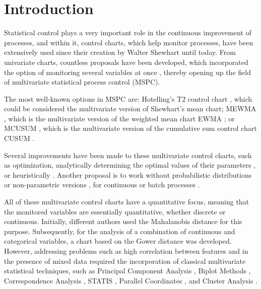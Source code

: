 \documentclass[mathematics,article,submit,moreauthors,pdftex]{mdpi}
\begin{document}

\hypertarget{introduction}{%
\section{Introduction}\label{introduction}}

Statistical control plays a very important role in the continuous
improvement of processes, and within it, control charts, which help
monitor processes, have been extensively used since their creation by
Walter Shewhart \citep{Gutierrez2013} until today. From univariate
charts, countless proposals have been developed, which incorporated the
option of monitoring several variables at once
\citep{ramos2017, li2012}, thereby opening up the field of multivariate
statistical process control (MSPC).

The most well-known options in MSPC are: Hotelling's T2 control chart
\citep{hotelling1947}, which could be considered the multivariate
version of Shewhart's mean chart; MEWMA \citep{lowry1992}, which is the
multivariate version of the weighted mean chart EWMA
\citep{roberts2000control}; or MCUSUM \citep{Crosier1988}, which is the
multivariate version of the cumulative sum control chart CUSUM
\citep{page1954continuous}.

Several improvements have been made to these multivariate control
charts, such as optimization, analytically determining the optimal
values of their parameters \citep{Aparisi1996, Aparisi2001, Faraz2006},
or heuristically \citep{ruiz2013}. Another proposal is to work without
probabilistic distributions or non-parametric versions
\citep{shabbak2012, liu2020, xue2020}, for continuous or batch processes
\citep{ramos2017}.

All of these multivariate control charts have a quantitative focus,
meaning that the monitored variables are essentially quantitative,
whether discrete or continuous. Initially, different authors used the
Mahalanobis distance \citep{mahalanobis1936generalised} for this
purpose. Subsequently, for the analysis of a combination of continuous
and categorical variables, a chart based on the Gower distance
\citep{Tuerhong2014} was developed. However, addressing problems such as
high correlation between features and in the presence of mixed data
required the incorporation of classical multivariate statistical
techniques, such as Principal Component Analysis
\citep{pearson1901liii}, Biplot Methods
\citep{gabriel1971biplot, galindojk}, Correspondence Analysis
\citep{Benzecri}, STATIS
\citep{l1976structuration, robert1976unifying, lavit1988presentation},
Parallel Coordinates \citep{inselberg1990parallel}, and Cluster Analysis
\citep{edwards1965method}.
\end{document}
